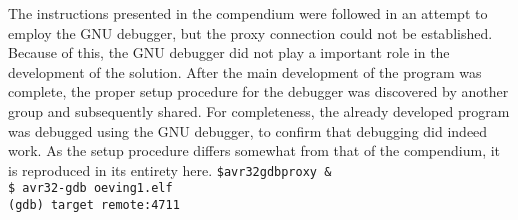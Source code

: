 The instructions presented in the compendium were followed in an attempt to employ the GNU debugger, but the proxy connection could not be established.
Because of this, the GNU debugger did not play a important role in the development of the solution.
After the main development of the program was complete, the proper setup procedure for the debugger was discovered by another group and subsequently shared.
For completeness, the already developed program was debugged using the GNU debugger, to confirm that debugging did indeed work.
As the setup procedure differs somewhat from that of the compendium, it is reproduced in its entirety here.
\texttt{\$avr32gdbproxy &\\
\$ avr32-gdb oeving1.elf \\
(gdb) target remote:4711}
